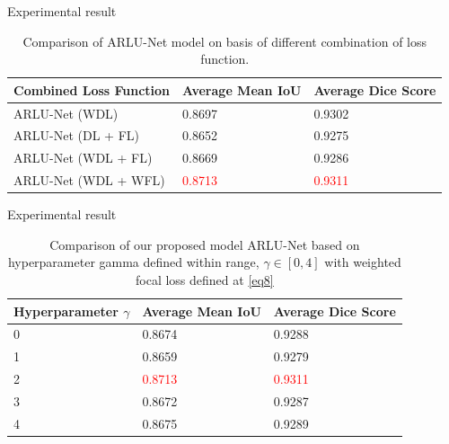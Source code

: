 \documentclass [xcolor=svgnames, t] {beamer}
\begin{document}
\begin{frame}{Experimental result}
\vspace*{\fill}
    \begin{table}
\caption{Comparison of ARLU-Net model on basis of different combination of loss function.}
\label{table}
\setlength{\tabcolsep}{3pt}
\begin{tabular}{|l|l|l|}
\hline
\textbf{Combined Loss Function} & \textbf{Average Mean IoU} & \textbf{Average Dice Score} \\
\hline
\hline
 ARLU-Net (WDL) & 0.8697 & 0.9302\\
 \hline
 ARLU-Net (DL + FL) & 0.8652 & 0.9275\\
 \hline
 ARLU-Net (WDL + FL) & 0.8669 & 0.9286 \\
 \hline
 ARLU-Net (WDL + WFL) & \textcolor{red}{0.8713} & \textcolor{red}{0.9311}\\
\hline
\end{tabular}
\end{table}
\vspace*{\fill}
\end{frame}

\begin{frame}{Experimental result}
\vspace*{\fill}
    \begin{table}
\caption{Comparison of our proposed model ARLU-Net based on hyperparameter gamma defined within range, $\gamma \in [0,4]$ with weighted focal loss defined at \eqref{eq8}}
\label{table}
\setlength{\tabcolsep}{3pt}
\begin{tabular}{|l|l|l| }
\hline
\textbf{Hyperparameter $\gamma$} & \textbf{Average Mean IoU} & \textbf{Average Dice Score} \\
\hline
\hline
0 & 0.8674 & 0.9288\\
\hline
1 & 0.8659 & 0.9279\\
\hline
2 & \textcolor{red}{0.8713} & \textcolor{red}{0.9311}\\
\hline
3  & 0.8672 & 0.9287\\
\hline
4 & 0.8675 & 0.9289\\
\hline
\end{tabular}
\label{tab5}
\end{table}
\vspace*{\fill}
\end{frame}
\end{document}
